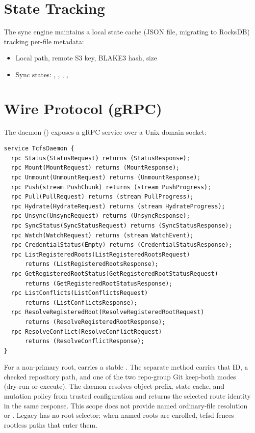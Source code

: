 \documentclass[11pt,a4paper]{article}
\begin{document}
\section{State Tracking}

The sync engine maintains a local state cache (JSON file, migrating to RocksDB)
tracking per-file metadata:

\begin{itemize}
  \item Local path, remote S3 key, BLAKE3 hash, size
  \item Sync states: , , ,
        , 
\end{itemize}

\section{Wire Protocol (gRPC)}

The daemon (\tcfsd{}) exposes a gRPC service over a Unix domain socket:

\begin{lstlisting}[language=protobuf]
service TcfsDaemon {
  rpc Status(StatusRequest) returns (StatusResponse);
  rpc Mount(MountRequest) returns (MountResponse);
  rpc Unmount(UnmountRequest) returns (UnmountResponse);
  rpc Push(stream PushChunk) returns (stream PushProgress);
  rpc Pull(PullRequest) returns (stream PullProgress);
  rpc Hydrate(HydrateRequest) returns (stream HydrateProgress);
  rpc Unsync(UnsyncRequest) returns (UnsyncResponse);
  rpc SyncStatus(SyncStatusRequest) returns (SyncStatusResponse);
  rpc Watch(WatchRequest) returns (stream WatchEvent);
  rpc CredentialStatus(Empty) returns (CredentialStatusResponse);
  rpc ListRegisteredRoots(ListRegisteredRootsRequest)
      returns (ListRegisteredRootsResponse);
  rpc GetRegisteredRootStatus(GetRegisteredRootStatusRequest)
      returns (GetRegisteredRootStatusResponse);
  rpc ListConflicts(ListConflictsRequest)
      returns (ListConflictsResponse);
  rpc ResolveRegisteredRoot(ResolveRegisteredRootRequest)
      returns (ResolveRegisteredRootResponse);
  rpc ResolveConflict(ResolveConflictRequest)
      returns (ResolveConflictResponse);
}
\end{lstlisting}

For a non-primary root,  carries a stable .
The separate  method carries that ID, a checked
repository path, and one of the two repo-group Git keep-both modes (dry-run or
execute). The daemon resolves object prefix, state cache, and mutation policy
from trusted configuration and returns the selected route identity in the same
response. This scope does not provide named ordinary-file resolution or
. Legacy  has no root selector;
when named roots are enrolled, tcfsd fences rootless paths that enter them.
\end{document}
